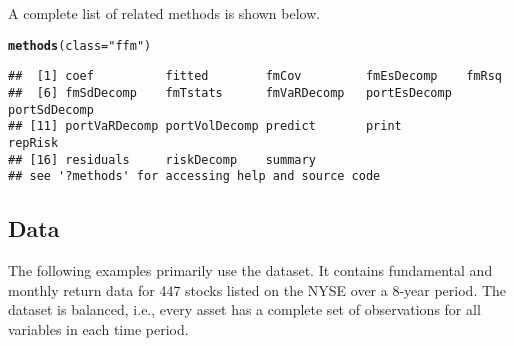 \documentclass[a4paper]{article}\usepackage[]{graphicx}\usepackage[]{color}
\makeatletter
\newcommand{\hlstr}[1]{\textcolor[rgb]{0.192,0.494,0.8}{#1}}%
\newcommand{\hlstd}[1]{\textcolor[rgb]{0.345,0.345,0.345}{#1}}%
\newcommand{\hlkwc}[1]{\textcolor[rgb]{0.333,0.667,0.333}{#1}}%
\newcommand{\hlkwd}[1]{\textcolor[rgb]{0.737,0.353,0.396}{\textbf{#1}}}%
\newenvironment{kframe}{%
 \def\at@end@of@kframe{}%
 \ifinner\ifhmode%
  \def\at@end@of@kframe{\end{minipage}}%
  \begin{minipage}{\columnwidth}%
 \fi\fi%
 \def\FrameCommand##1{\hskip\@totalleftmargin \hskip-\fboxsep
 \colorbox{shadecolor}{##1}\hskip-\fboxsep
     \hskip-\linewidth \hskip-\@totalleftmargin \hskip\columnwidth}%
 \MakeFramed {\advance\hsize-\width
   \@totalleftmargin\z@ \linewidth\hsize
   \@setminipage}}%
 {\par\unskip\endMakeFramed%
 \at@end@of@kframe}
\newenvironment{knitrout}{}{} %
\makeatother
\begin{document}
A complete list of related methods is shown below.
\begin{knitrout}
\color{fgcolor}\begin{kframe}
\begin{alltt}
\hlkwd{methods}\hlstd{(}\hlkwc{class}\hlstd{=}\hlstr{"ffm"}\hlstd{)}
\end{alltt}
\begin{verbatim}
##  [1] coef          fitted        fmCov         fmEsDecomp    fmRsq        
##  [6] fmSdDecomp    fmTstats      fmVaRDecomp   portEsDecomp  portSdDecomp 
## [11] portVaRDecomp portVolDecomp predict       print         repRisk      
## [16] residuals     riskDecomp    summary      
## see '?methods' for accessing help and source code
\end{verbatim}
\end{kframe}
\end{knitrout}

\subsection{Data}

The following examples primarily use the  dataset. It contains fundamental and monthly return data for 447 stocks listed on the NYSE over a 8-year period. The dataset is balanced, i.e., every asset has a complete set of observations for all variables in each time period.
\end{document}
